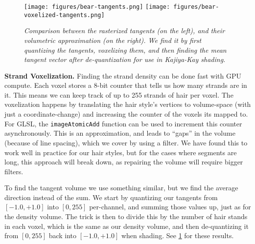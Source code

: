 \documentclass{egpubl}
\begin{document}
\begin{figure}[htb]
    \centering
    \texttt{[image: figures/bear-tangents.png]}
    \hfill
    \texttt{[image: figures/bear-voxelized-tangents.png]}
    \caption{\emph{Comparison between the rasterized tangents (on the left), and their volumetric approximation (on the right). We find it by first quantizing the tangents, voxelizing them, and then finding the mean tangent vector after de-quantization for use in Kajiya-Kay shading.}}
    \label{fig:tangents}
    \vspace{-2mm}
\end{figure}

\noindent \textbf{Strand Voxelization. } Finding the strand density can be done fast with GPU compute. Each voxel stores a 8-bit counter that tells us how many strands are in it. This means we can keep track of up to 255 strands of hair per voxel. The voxelization happens by translating the hair style's vertices to volume-space (with just a coordinate-change) and increasing the counter of the voxels its mapped to. For GLSL, the \texttt{imageAtomicAdd} function can be used to increment this counter asynchronously. This is an approximation, and leads to ``gaps'' in the volume (because of line spacing), which we cover by using a filter. We have found this to work well in practice for our hair styles, but for the cases where segments are long, this approach will break down, as repairing the volume will require bigger filters.


To find the tangent volume we use something similar, but we find the average direction instead of the sum. We start by quantizing our tangents from $[-1.0,+1.0]$ into $[0,255]$ per-channel, and summing those values up, just as for the density volume. The trick is then to divide this by the number of hair stands in each voxel, which is the same as our density volume, and then de-quantizing it from $[0,255]$ back into $[-1.0,+1.0]$ when shading. See \cref{fig:tangents} for these results.
\end{document}

